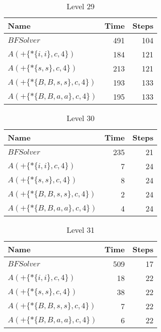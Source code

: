 \begin{table} \centering \begin{tabular}{lrr}\toprule \textbf{ Name }
    & \textbf{ Time } & \textbf{ Steps }\\\midrule
    $BFSolver$ & 491 & 104 \\
    $A(+\{*\{i,i\},c,4\})$ & 184 & 121 \\
    $A(+\{*\{s,s\},c,4\})$ & 213 & 121 \\
    $A(+\{*\{B,B,s,s\},c,4\})$ & 193 & 133 \\
    $A(+\{*\{B,B,a,a\},c,4\})$ & 195 & 133 \\
    \bottomrule \end{tabular} \caption{Level 29}
  \label{tab:level_29} \end{table}

\begin{table} \centering \begin{tabular}{lrr}\toprule \textbf{ Name }
    & \textbf{ Time } & \textbf{ Steps }\\\midrule
    $BFSolver$ & 235 & 21 \\
    $A(+\{*\{i,i\},c,4\})$ & 7 & 24 \\
    $A(+\{*\{s,s\},c,4\})$ & 8 & 24 \\
    $A(+\{*\{B,B,s,s\},c,4\})$ & 2 & 24 \\
    $A(+\{*\{B,B,a,a\},c,4\})$ & 4 & 24 \\
    \bottomrule \end{tabular} \caption{Level 30}
  \label{tab:level_30} \end{table}

\clearpage

\begin{table} \centering \begin{tabular}{lrr}\toprule \textbf{ Name }
    & \textbf{ Time } & \textbf{ Steps }\\\midrule
    $BFSolver$ & 509 & 17 \\
    $A(+\{*\{i,i\},c,4\})$ & 18 & 22 \\
    $A(+\{*\{s,s\},c,4\})$ & 38 & 22 \\
    $A(+\{*\{B,B,s,s\},c,4\})$ & 7 & 22 \\
    $A(+\{*\{B,B,a,a\},c,4\})$ & 6 & 22 \\
    \bottomrule \end{tabular} \caption{Level 31}
  \label{tab:level_31} \end{table}

